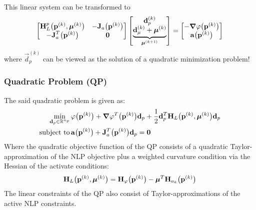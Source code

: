 			This linear system can be transformed to
			\begin{align*}
				\begin{bmatrix}
					\boldsymbol{\mathrm{H}}_L^p\big(\boldsymbol{\mathrm{p}}^{(k)}, \boldsymbol{\mathrm{\mu}}^{(k)}\big) & -\boldsymbol{\mathrm{J}}_a\big(\boldsymbol{\mathrm{p}}^{(k)}\big) \\
					-\boldsymbol{\mathrm{J}}_a^T\big(\boldsymbol{\mathrm{p}}^{(k)}\big) & \boldsymbol{\mathrm{0}}
				\end{bmatrix}
				\begin{bmatrix}
					\boldsymbol{\mathrm{d}}_p^{(k)} \\
					\underbrace{\boldsymbol{\mathrm{d}}_\mu^{(k)} + \boldsymbol{\mathrm{\mu}}^{(k)}}_{\boldsymbol{\mathrm{\mu}}^{(k + 1)}}
				\end{bmatrix}
				=
				\begin{bmatrix}
					-\grad{\varphi}\big(\boldsymbol{\mathrm{p}}^{(k)}\big) \\
					\boldsymbol{\mathrm{a}}\big(\boldsymbol{\mathrm{p}}^{(k)}\big)
				\end{bmatrix}
			\end{align*}
			where \( \vec{d}_p^{(k)} \) can be viewed as the solution of a quadratic minimization problem!

			\subsubsection{Quadratic Problem (QP)}
				The said quadratic problem is given as:
				\begin{align*}
					\min_{\boldsymbol{\mathrm{d}}_p \in \mathbb{R}^{n_p}} &\, \varphi\big(\boldsymbol{\mathrm{p}}^{(k)}\big) + \grad{\varphi}^T\big(\boldsymbol{\mathrm{p}}^{(k)}\big) \boldsymbol{\mathrm{d}}_p + \frac{1}{2} \boldsymbol{\mathrm{d}}_p^T \boldsymbol{\mathrm{H}}_L\big(\boldsymbol{\mathrm{p}}^{(k)}, \boldsymbol{\mathrm{\mu}}^{(k)}\big) \boldsymbol{\mathrm{d}}_p \\
					\mathrm{subject~to} &\, \boldsymbol{\mathrm{a}}\big(\boldsymbol{\mathrm{p}}^{(k)}\big) + \boldsymbol{\mathrm{J}}_a^T\big(\boldsymbol{\mathrm{p}}^{(k)}\big) \boldsymbol{\mathrm{d}}_p = \boldsymbol{\mathrm{0}}
				\end{align*}
				Where the quadratic objective function of the QP consists of a quadratic Taylor-approximation of the NLP objective plus a weighted curvature condition via the Hessian of the activate conditions:
				\begin{align*}
					\boldsymbol{\mathrm{H}}_L\big(\boldsymbol{\mathrm{p}}^{(k)}, \boldsymbol{\mathrm{\mu}}^{(k)}\big) = \boldsymbol{\mathrm{H}}_\varphi\big(\boldsymbol{\mathrm{p}}^{(k)}\big) - \boldsymbol{\mathrm{\mu}}^T \boldsymbol{\mathrm{H}}_{a_k}\big(\boldsymbol{\mathrm{p}}^{(k)}\big)
				\end{align*}
				The linear constraints of the QP also consist of Taylor-approximations of the active NLP constraints.
				
